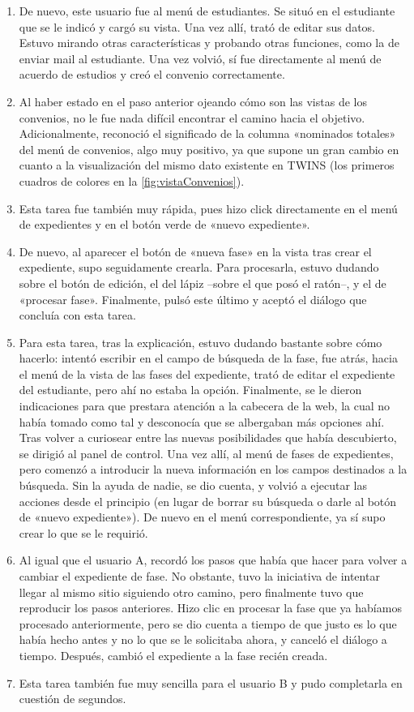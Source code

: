 \begin{enumerate}
	\item De nuevo, este usuario fue al menú de estudiantes. Se situó en el estudiante que se le indicó y cargó su vista. Una vez allí, trató de editar sus datos. Estuvo mirando otras características y probando otras funciones, como la de enviar mail al estudiante. Una vez volvió, sí fue directamente al menú de acuerdo de estudios y creó el convenio correctamente.
	\item Al haber estado en el paso anterior ojeando cómo son las vistas de los convenios, no le fue nada difícil encontrar el camino hacia el objetivo. Adicionalmente, reconoció el significado de la columna «nominados totales» del menú de convenios, algo muy positivo, ya que supone un gran cambio en cuanto a la visualización del mismo dato existente en TWINS (los primeros cuadros de colores en la \ref{fig:vistaConvenios}).
	\item Esta tarea fue también muy rápida, pues hizo click directamente en el menú de expedientes y en el botón verde de «nuevo expediente».
	\item De nuevo, al aparecer el botón de «nueva fase» en la vista tras crear el expediente, supo seguidamente crearla. Para procesarla, estuvo dudando sobre el botón de edición, el del lápiz --sobre el que posó el ratón--,  y el de «procesar fase». Finalmente, pulsó este último y aceptó el diálogo que concluía con esta tarea.
	\item Para esta tarea, tras la explicación, estuvo dudando bastante sobre cómo hacerlo: intentó escribir en el campo de búsqueda de la fase, fue atrás, hacia el menú de la vista de las fases del expediente, trató de editar el expediente del estudiante, pero ahí no estaba la opción. Finalmente, se le dieron indicaciones para que prestara atención a la cabecera de la web, la cual no había tomado como tal y desconocía que se albergaban más opciones ahí. Tras volver a curiosear entre las nuevas posibilidades que había descubierto, se dirigió al panel de control. Una vez allí, al menú de fases de expedientes, pero comenzó a introducir la nueva información en los campos destinados a la búsqueda. Sin la ayuda de nadie, se dio cuenta, y volvió a ejecutar las acciones desde el principio (en lugar de borrar su búsqueda o darle al botón de «nuevo expediente»). De nuevo en el menú correspondiente, ya sí supo crear lo que se le requirió.
	\item Al igual que el usuario A, recordó los pasos que había que hacer para volver a cambiar el expediente de fase. No obstante, tuvo la iniciativa de intentar llegar al mismo sitio siguiendo otro camino, pero finalmente tuvo que reproducir los pasos anteriores. Hizo clic en procesar la fase que ya habíamos procesado anteriormente, pero se dio cuenta a tiempo de que justo es lo que había hecho antes y no lo que se le solicitaba ahora, y canceló el diálogo a tiempo. Después, cambió el expediente a la fase recién creada.
	\item Esta tarea también fue muy sencilla para el usuario B y pudo completarla en cuestión de segundos.
	
\end{enumerate}

